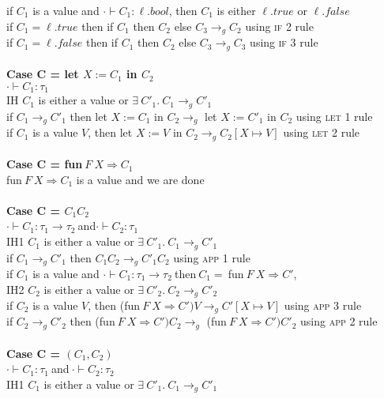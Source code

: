 \documentclass{article}
\begin{document}
if $C_1$ is a value and $\cdot \vdash C_1: \ell.bool$, then $C_1$ is either $\ell.true$ or $\ell.false$ \\
if $C_1 = \ell.true$ then if $C_1$ then $C_2$ else $C_3 \to_g C_2$ using \textsc{if 2} rule\\
if $C_1 = \ell.false$ then if $C_1$ then $C_2$ else $C_3 \to_g C_3$ using \textsc{if 3} rule\\
\\
\textbf{Case C = let $X := C_1$ in $C_2$} \\
$\cdot \vdash C_1: \tau_1$\\
IH $C_1$ is either a value or $  \exists \ C'_1.\ C_1 \to_g C'_1 $ \\
if $C_1 \to_g C'_1$ then let $X := C_1$ in $C_2 \to_g $ let $X := C'_1$ in $C_2$ using \textsc{let 1} rule\\
if $C_1$ is a value $V$, then let $X := V$ in $C_2 \to_g C_2[X \mapsto V]$ using \textsc{let 2} rule
\\ \\
\textbf{Case C = fun$\ F\ X \Rightarrow C_1$ } \\
fun$\ F\ X \Rightarrow C_1$ is a value and we are done 
\\\\
\textbf{Case C = $C_1 C_2$} \\
$\cdot \vdash C_1: \tau_1 \to \tau_2\ $and$\cdot \vdash C_2: \tau_1$\\
IH1 $C_1$ is either a value or $  \exists \ C'_1.\ C_1 \to_g C'_1 $ \\
if $C_1 \to_g C'_1$ then $C_1 C_2 \to_g C'_1 C_2$ using \textsc{app 1} rule\\
if $C_1$ is a value and $\cdot \vdash C_1: \tau_1 \to \tau_2\ $then$\ C_1 =\ $fun$\ F\ X \Rightarrow C'$,\\
IH2 $C_2$ is either a value or $  \exists \ C'_2.\ C_2 \to_g C'_2 $ \\
if $C_2$ is a value $V$, then (fun$\ F\ X \Rightarrow C') V \to_g C'[X \mapsto V]$ using \textsc{app 3} rule \\
if $C_2 \to_g C'_2$ then (fun$\ F\ X \Rightarrow C') C_2 \to_g$ (fun$\ F\ X \Rightarrow C') C'_2$ using \textsc{app 2} rule 
\\ \\
\textbf{Case C = $(C_1,C_2)$} \\
$\cdot \vdash C_1: \tau_1\ $and$\ \cdot \vdash C_2: \tau_2\ $\\
IH1 $C_1$ is either a value or $  \exists \ C'_1.\ C_1 \to_g C'_1 $ \\
\end{document}
